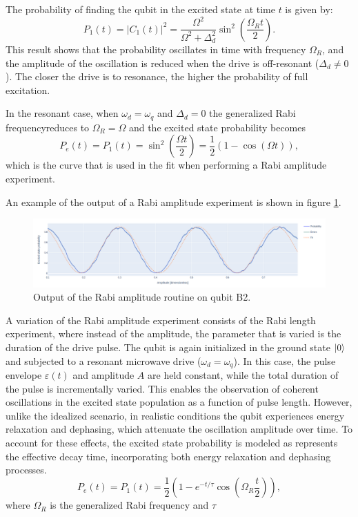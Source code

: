 The probability of finding the qubit in the excited state at time $t$ is given by:
\begin{equation}
    P_1(t) = |C_1(t)|^2 = \frac{\Omega^2}{\Omega^2 + \Delta_d^2} \sin^2 \left( \frac{\Omega_R t}{2} \right).
\end{equation}
This result shows that the probability oscillates in time with frequency $\Omega_R$, and the amplitude of the oscillation is reduced when the drive is off-resonant ($\Delta_d \neq 0$).
The closer the drive is to resonance, the higher the probability of full excitation.

In the resonant case, when $\omega_d =\omega_q$ and $\Delta_d = 0$ the generalized Rabi frequencyreduces to $\Omega_R = \Omega$ and the excited state probability becomes
\begin{equation}\label{eq:rabi_amplitude}
    P_e (t) = P_1(t) = \sin^2\left(\frac{\Omega t}{2} \right) = \frac{1}{2}(1-\cos(\Omega t)),
\end{equation}
which is the curve that is used in the fit when performing a Rabi amplitude experiment.

An example of the output of a Rabi amplitude experiment is shown in figure \ref{fig:rabi_amplitude}.
\begin{figure}[h!]
    \centering
    \includegraphics[width=\textwidth]{figures/png/rabi_amp.png}
    \caption{Output of the Rabi amplitude routine on qubit B2.}
    \label{fig:rabi_amplitude}
\end{figure}

A variation of the Rabi amplitude experiment consists of the Rabi length experiment, where instead of the amplitude, the parameter that is varied is the duration of the drive pulse.
The qubit is again initialized in the ground state $\ket{0}$ and subjected to a resonant microwave drive ($\omega_d = \omega_q$). 
In this case, the pulse envelope $\varepsilon(t)$ and amplitude $A$ are held constant, while the total duration of the pulse is incrementally varied. 
This enables the observation of coherent oscillations in the excited state population as a function of pulse length. 
However, unlike the idealized scenario, in realistic conditions the qubit experiences energy relaxation and dephasing, which attenuate the oscillation amplitude over time. 
To account for these effects, the excited state probability is modeled as represents the effective decay time, incorporating both energy relaxation and dephasing processes.
\begin{equation}
    P_e (t) = P_1(t)= \frac{1}{2}\left(1- e^{-t/\tau}\cos(\Omega_R \frac{t}{2})\right),
\end{equation}
where $\Omega_R$ is the generalized Rabi frequency and $\tau$ 

